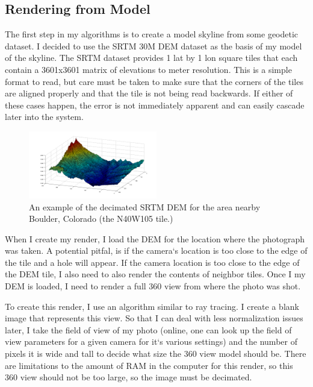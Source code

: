\documentclass{acm_proc_article-sp}
\begin{document}
\subsection{Rendering from Model}
The first step in my algorithms is to create a model skyline from some geodetic dataset.  I decided to use the  SRTM 30M DEM dataset as the basis of my model of the skyline.  The SRTM dataset provides 1 lat by 1 lon square tiles that each contain a 3601x3601 matrix of elevations to meter resolution. \cite{farr2007shuttle} This is a simple format to read, but care must be taken to make sure that the corners of the tiles are aligned properly and that the tile is not being read backwards. If either of these cases happen, the error is not immediately apparent and can easily cascade later into the system.  
\begin{figure}
	\centering
	\includegraphics[width=0.5\textwidth]{boulderDem.png}
	\caption{An example of the decimated SRTM DEM for the area nearby Boulder, Colorado (the N40W105 tile.)}
	\label{fig:bldrDem}
\end{figure}

When I create my render, I load the DEM for the location where the photograph was taken.   A potential pitfal, is if the camera`s location is too close to the edge of the tile and a hole will appear.  If the camera location is too close to the edge of the DEM tile, I also need to also render the contents of neighbor tiles.  Once I my DEM is loaded, I need to render a full 360 view from where the photo was shot.  

To create this render, I use an algorithm similar to ray tracing.  I create a blank image that represents this view.  So that I can deal with less normalization issues later, I take the field of view of my photo (online, one can look up the field of view parameters for a given camera for it`s various settings) and the number of pixels it is wide and tall to decide what size the 360 view model should be.  There are limitations to the amount of RAM in the computer for this render, so this 360 view should not be too large, so the image must be decimated.
\end{document}
